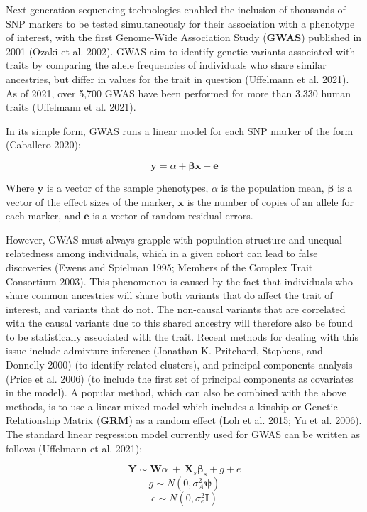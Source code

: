 \documentclass[
]{book}
\begin{document}
Next-generation sequencing technologies enabled the inclusion of thousands of SNP markers to be tested simultaneously for their association with a phenotype of interest, with the first Genome-Wide Association Study (\textbf{GWAS}) published in 2001 (Ozaki et al. 2002). GWAS aim to identify genetic variants associated with traits by comparing the allele frequencies of individuals who share similar ancestries, but differ in values for the trait in question (Uffelmann et al. 2021). As of 2021, over 5,700 GWAS have been performed for more than 3,330 human traits (Uffelmann et al. 2021).

In its simple form, GWAS runs a linear model for each SNP marker of the form (Caballero 2020):

\begin{equation}
\textbf{y} = \alpha + \pmb{\beta} \textbf{x} + \textbf{e} \label{eq:gwassimp}
\end{equation}

Where \(\textbf{y}\) is a vector of the sample phenotypes, \(\alpha\) is the population mean, \(\pmb{\beta}\) is a vector of the effect sizes of the marker, \(\textbf{x}\) is the number of copies of an allele for each marker, and \(\textbf{e}\) is a vector of random residual errors.

However, GWAS must always grapple with population structure and unequal relatedness among individuals, which in a given cohort can lead to false discoveries (Ewens and Spielman 1995; Members of the Complex Trait Consortium 2003). This phenomenon is caused by the fact that individuals who share common ancestries will share both variants that do affect the trait of interest, and variants that do not. The non-causal variants that are correlated with the causal variants due to this shared ancestry will therefore also be found to be statistically associated with the trait. Recent methods for dealing with this issue include admixture inference (Jonathan K. Pritchard, Stephens, and Donnelly 2000) (to identify related clusters), and principal components analysis (Price et al. 2006) (to include the first set of principal components as covariates in the model). A popular method, which can also be combined with the above methods, is to use a linear mixed model which includes a kinship or Genetic Relationship Matrix (\textbf{GRM}) as a random effect (Loh et al. 2015; Yu et al. 2006). The standard linear regression model currently used for GWAS can be written as follows (Uffelmann et al. 2021):

\begin{equation}
\textbf{Y} \sim \textbf{W} \alpha ~+~\textbf{X}_s\pmb{\beta}_s + g + e \label{eq:gwaslmm}
\end{equation}
\begin{equation}
g \sim N(0,\sigma^2_A\pmb{\psi}) \label{eq:gwaslmmg}
\end{equation}
\begin{equation}
e \sim N(0,\sigma^2_e \textbf{I}) \label{eq:gwaslmme}
\end{equation}
\end{document}
